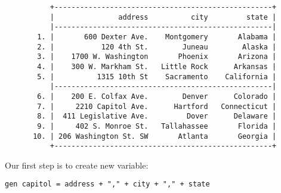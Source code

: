 \documentclass[11pt]{article}
\begin{document}
\begin{figure}[ht]
\begin{center}
\begin{verbatim}
     +---------------------------------------------------+
     |               address          city         state |
     |---------------------------------------------------|
  1. |       600 Dexter Ave.    Montgomery       Alabama |
  2. |           120 4th St.        Juneau        Alaska |
  3. |    1700 W. Washington       Phoenix       Arizona |
  4. |    300 W. Markham St.   Little Rock      Arkansas |
  5. |          1315 10th St    Sacramento    California |
     |---------------------------------------------------|
  6. |    200 E. Colfax Ave.        Denver      Colorado |
  7. |     2210 Capitol Ave.      Hartford   Connecticut |
  8. |  411 Legislative Ave.         Dover      Delaware |
  9. |     402 S. Monroe St.   Tallahassee       Florida |
 10. | 206 Washington St. SW       Atlanta       Georgia |
     +---------------------------------------------------+

\end{verbatim}
\end{center}
\end{figure}

Our first step is to create new variable:
\begin{center}
\verb|gen capitol = address + "," + city + "," + state|
\end{center}
\end{document}
